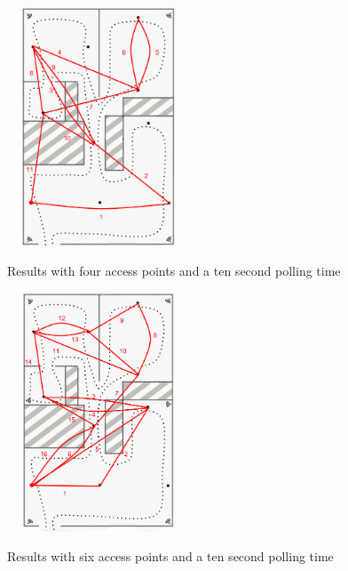 \begin{figure}
	\centering
	\begin{minipage}{0.45\textwidth}
		\ \includegraphics[width=2in,height=2.8in]{loc1_4ap_10s.png}
		\caption{Results with four access points and a ten second polling time}
		\label{loc1_4ap_10s}
	\end{minipage}\hfill
	\begin{minipage}{0.45\textwidth}
		\centering
		\ \includegraphics[width=2in,height=2.8in]{loc1_6ap_10s.png}
		\caption{Results with six access points and a ten second polling time}
		\label{loc1_6ap_10s}
	\end{minipage}
\end{figure}

